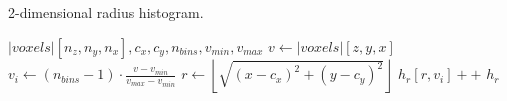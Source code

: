 \documentclass[pdflatex,sn-mathphys]{sn-jnl}%
\theoremstyle{thmstyleone}%
\theoremstyle{thmstyletwo}%
\theoremstyle{thmstylethree}%
\begin{document}

\begin{algorithm}
    \caption{2-dimensional radius histogram.}
    \label{alg:2dhists}
    \begin{algorithmic}
         {$|voxels|[n_z,n_y,n_x],c_x,c_y,n_{bins},v_{min},v_{max}$}
                \State $v \gets |voxels|[z,y,x]$
                    \State $v_{i} \gets (n_{bins}-1) \cdot \frac{v - v_{min}}{v_{max} - v_{min}}$
                    \State $r \gets \left\lfloor\sqrt{(x-c_x)^2 + (y-c_y)^2}\right\rfloor$
                    \State $h_r[r,v_{i}]{+}{+}$
                \EndIf
            \EndFor
            \State \Return $h_r$
        \EndFunction
    \end{algorithmic}
\end{algorithm}
\end{document}

